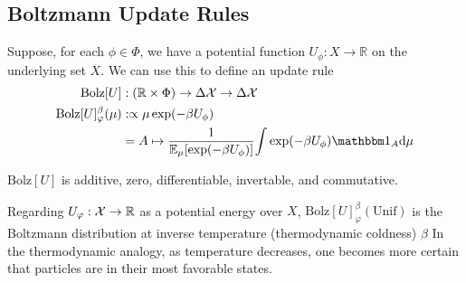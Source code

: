 \documentclass{article}
\newcommand{\Unif}{\mathrm{Unif}}
\begin{document}
\TODO


\subsection{Boltzmann Update Rules}
%
%
\def\Bolz#1{\mathrm{Bolz}[#1]}
Suppose, for each $\phi \in \Phi$, we have a potential function $U_\phi : X \to \mathbb R$ on the underlying set $X$.
We can use this to define an update rule
\begin{align*}
    \Bolz U &: (\mathbb R \times \Phi) \to \Delta\X \to \Delta\X \\
    \Bolz U^\beta_\varphi(\mu)
        &:\propto
            \mu \exp(-\beta U_\phi) \\
        &= A \mapsto \frac
            1{\Ex_{\mu} [ \exp(-\beta U_\phi)]}
            {\int \exp(-\beta U_\phi) \mathbbm 1_A \mathrm d\mu }
\end{align*}

\begin{prop}
    $\Bolz U$ is additive, zero, differentiable, invertable, and commutative.
\end{prop}


\begin{remark}
    Regarding $U_\varphi : \mathcal X \to \mathbb R$ as a potential energy over $X$,
    $\Bolz U^\beta_\varphi(\Unif)$ is the Boltzmann distribution at inverse temperature (thermodynamic coldness) $\beta$
    In the thermodynamic analogy, as temperature decreases, one becomes more certain that particles are in their most favorable states.
\end{remark}
\end{document}
